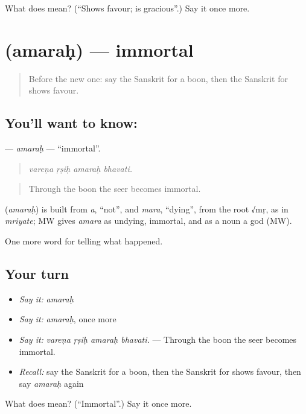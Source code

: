 \begin{tcolorbox}[breakable,colback=teal!4,colframe=teal!35!black,title={Before you move on}]
What does  mean? (\textquotedblleft{}Shows favour; is gracious\textquotedblright{}.) Say it once more.
\end{tcolorbox}
\section[\texorpdfstring{\sk{अमरः} (amaraḥ)}{अमरः (amaraḥ)}]{ (amaraḥ) — immortal}

\label{lesson:SA-C333-amarah}



\begin{quote}
Before the new one: say the Sanskrit for a boon, then the Sanskrit for shows favour.
\end{quote}

\subsection*{You'll want to know: }
\textbf{} — \emph{amaraḥ} — \textquotedblleft{}immortal\textquotedblright{}.

\begin{quote}
   
\end{quote}

\begin{quote}
\emph{vareṇa ṛṣiḥ amaraḥ bhavati.}
\end{quote}

\begin{quote}
Through the boon the seer becomes immortal.
\end{quote}

\begin{cousinweb}
\textbf{} (\emph{amaraḥ}) is built from \emph{a}, \textquotedblleft{}not\textquotedblright{}, and \emph{mara}, \textquotedblleft{}dying\textquotedblright{}, from the root √mṛ, as in \emph{mriyate}; MW gives \emph{amara} as undying, immortal, and as a noun a god (MW).
\end{cousinweb}

\begin{grammarlens}[title={What you've built}]
One more word for telling what happened.
\end{grammarlens}

\subsection*{Your turn}
\begin{itemize}
\raggedright
  \item \emph{Say it:} \emph{amaraḥ}
  \item \emph{Say it:} \emph{amaraḥ}, once more
  \item \emph{Say it:} \emph{vareṇa ṛṣiḥ amaraḥ bhavati.} — Through the boon the seer becomes immortal.
  \item \emph{Recall:} say the Sanskrit for a boon, then the Sanskrit for shows favour, then say \emph{amaraḥ} again
\end{itemize}

\begin{tcolorbox}[breakable,colback=teal!4,colframe=teal!35!black,title={Before you move on}]
What does  mean? (\textquotedblleft{}Immortal\textquotedblright{}.) Say it once more.
\end{tcolorbox}
